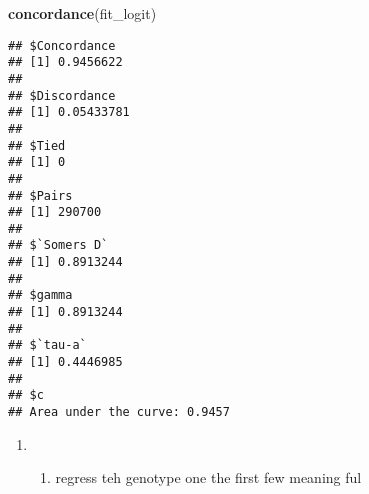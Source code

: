 \documentclass[]{article}
\newenvironment{Shaded}{\begin{snugshade}}{\end{snugshade}}
\newcommand{\KeywordTok}[1]{\textcolor[rgb]{0.13,0.29,0.53}{\textbf{#1}}}
\newcommand{\DataTypeTok}[1]{\textcolor[rgb]{0.13,0.29,0.53}{#1}}
\newcommand{\DecValTok}[1]{\textcolor[rgb]{0.00,0.00,0.81}{#1}}
\newcommand{\StringTok}[1]{\textcolor[rgb]{0.31,0.60,0.02}{#1}}
\newcommand{\OperatorTok}[1]{\textcolor[rgb]{0.81,0.36,0.00}{\textbf{#1}}}
\newcommand{\NormalTok}[1]{#1}
\providecommand{\tightlist}{%
  \setlength{\itemsep}{0pt}\setlength{\parskip}{0pt}}
\begin{document}
\begin{Shaded}
\begin{Highlighting}[]
\KeywordTok{concordance}\NormalTok{(fit_logit)}
\end{Highlighting}
\end{Shaded}

\begin{verbatim}
## $Concordance
## [1] 0.9456622
## 
## $Discordance
## [1] 0.05433781
## 
## $Tied
## [1] 0
## 
## $Pairs
## [1] 290700
## 
## $`Somers D`
## [1] 0.8913244
## 
## $gamma
## [1] 0.8913244
## 
## $`tau-a`
## [1] 0.4446985
## 
## $c
## Area under the curve: 0.9457
\end{verbatim}

\begin{enumerate}
\def\labelenumi{(\alph{enumi})}
\setcounter{enumi}{3}
\item
  \begin{enumerate}
  \def\labelenumii{\roman{enumii}.}
  \setcounter{enumii}{1}
  \tightlist
  \item
    regress teh genotype one the first few meaning ful
  \end{enumerate}
\end{enumerate}

\begin{Shaded}
\end{Shaded}
\end{document}
